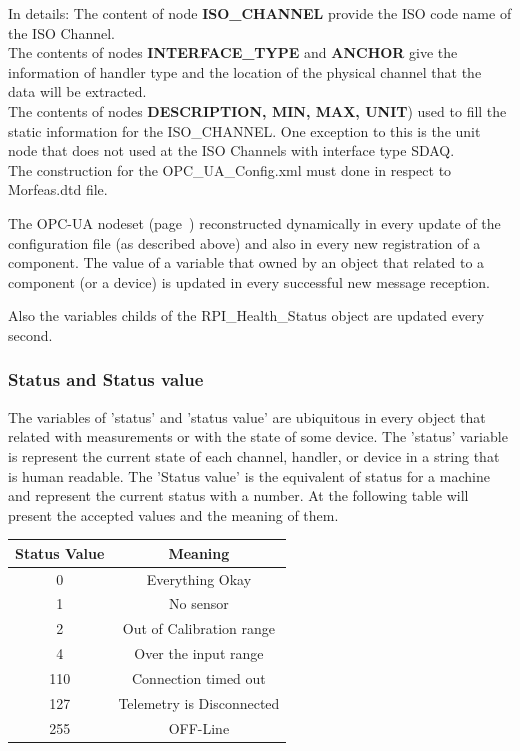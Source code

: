 \documentclass{article}
\begin{document}
In details:
The content of node \textbf{ISO\_CHANNEL} provide the ISO code name of the ISO Channel.\\
The contents of nodes \textbf{INTERFACE\_TYPE} and \textbf{ANCHOR} give the information of handler type and the location of the physical channel that the data will be extracted.\\
The contents of nodes \textbf{DESCRIPTION, MIN, MAX, UNIT}) used to fill the static information for the ISO\_CHANNEL. One exception to this is the unit node that does not used
at the ISO Channels with interface type SDAQ.\\
The construction for the OPC\_UA\_Config.xml must done in respect to Morfeas.dtd file.

The OPC-UA nodeset (page~\pageref{tree:OPC_UA_nodeset}) reconstructed dynamically in every update of the configuration file (as described above) and also in every new registration of a component.
The value of a variable that owned by an object that related to a component (or a device) is updated in every successful new message reception.

Also the variables childs of the RPI\_Health\_Status object are updated every second.

\subsubsection{Status and Status value}
 The variables of 'status' and 'status value' are ubiquitous in every object that related with measurements or with the state of some device.
 The 'status' variable is represent the current state of each channel, handler, or device in a string that is human readable. The 'Status value' is the equivalent of status for a machine
 and represent the current status with a number. At the following table will present the accepted values and the meaning of them.
 \begin{center}
 \begin{tabular}{||c | c||} 
 \hline
 Status Value & Meaning \\ [0.5ex] 
 \hline\hline
 0 & Everything Okay \\ 
 \hline
 1 & No sensor\\
 \hline
 2 & Out of Calibration range\\
 \hline
 4 & Over the input range\\
 \hline
 110 & Connection timed out\\
 \hline
 127 & Telemetry is Disconnected\\
 \hline
 255 & OFF-Line\\
 \hline
\end{tabular}
\end{center}
\end{document}
